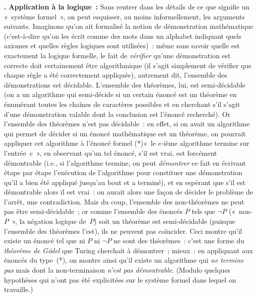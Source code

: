 \documentclass[12pt,a4paper]{article}
\theoremstyle{definition}
\newcommand\thingy{%
\refstepcounter{comcnt}\medskip\noindent\textbf{\thecomcnt.} }
\begin{document}
\bigbreak

{\footnotesize\thingy\textbf{Application à la logique :} Sans rentrer
  dans les détails de ce que signifie un « système formel », on peut
  esquisser, au moins informellement, les arguments suivants.
  Imaginons qu'on ait formalisé la notion de démonstration
  mathématique (c'est-à-dire qu'on les écrit comme des mots dans un
  alphabet indiquant quels axiomes et quelles règles logiques sont
  utilisées) : même sans savoir quelle est exactement la logique
  formelle, le fait de \emph{vérifier} qu'une démonstration est
  correcte doit certainement être algorithmique (il s'agit simplement
  de vérifier que chaque règle a été correctement appliquée),
  autrement dit, l'ensemble des démonstrations est décidable.
  L'ensemble des théorèmes, lui, est semi-décidable (on a un
  algorithme qui semi-décide si un certain énoncé est un théorème en
  énumérant toutes les chaînes de caractères possibles et en cherchant
  s'il s'agit d'une démonstration valable dont la conclusion est
  l'énoncé recherché).  Or l'ensemble des théorèmes n'est pas
  décidable : en effet, si on avait un algorithme qui permet de
  décider si un énoncé mathématique est un théorème, on pourrait
  appliquer cet algorithme à l'énoncé formel (*)« le $e$-ième
  algorithme termine sur l'entrée $e$ », en observant qu'un tel
  énoncé, s'il est vrai, est forcément démontrable (i.e., si
  l'algorithme termine, on peut \emph{démontrer} ce fait en écrivant
  étape par étape l'exécution de l'algorithme pour constituer une
  démonstration qu'il a bien été appliqué jusqu'au bout et a terminé),
  et en espérant que s'il est démontrable alors il est vrai : on
  aurait alors une façon de décider le problème de l'arrêt, une
  contradiction.  Mais du coup, l'ensemble des non-théorèmes ne peut
  pas être semi-décidable ; or comme l'ensemble des énoncés $P$ tels
  que $\neg P$ (« non-$P$ », la négation logique de $P$) soit un
  théorème est semi-décidable (puisque l'ensemble des théorèmes
  l'est), ils ne peuvent pas coïncider.  Ceci montre qu'il existe un
  énoncé tel que ni $P$ ni $\neg P$ ne sont des théorèmes : c'est une
  forme du \emph{théorème de Gödel} que Turing cherchait à démontrer ;
  mieux : en appliquant aux énoncés du type (*), on montre ainsi qu'il
  existe un algorithme qui \emph{ne termine pas} mais dont la
  non-terminaison \emph{n'est pas démontrable}.  (Modulo quelques
  hypothèses qui n'ont pas été explicitées sur le système formel dans
  lequel on travaille.)\par}
\end{document}
